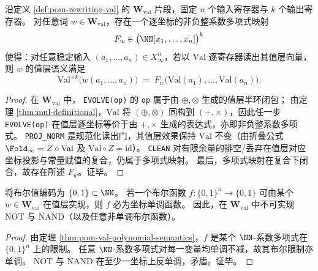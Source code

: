 \begin{theorem}[值层半环语义的多项式刻画]\label{thm:pom-val-polynomial-semantics}
沿定义 \ref{def:pom-rewriting-val} 的 \(\mathbf{W}_{\mathrm{val}}\) 片段，固定 \(n\) 个输入寄存器与 \(k\) 个输出寄存器。
对任意词 \(w\in\mathbf{W}_{\mathrm{val}}\)，存在一个逐坐标的非负整系数多项式映射
\[
F_w\in\bigl(\NN[x_1,\dots,x_n]\bigr)^k
\]
使得：对任意稳定输入 \((a_1,\dots,a_n)\in X_\infty^n\)，若以 \(\mathrm{Val}\) 逐寄存器读出其值层向量，则 \(w\) 的值层语义满足
\[
\mathrm{Val}^{\times k}\!\bigl(w(a_1,\dots,a_n)\bigr)
\;=\;
F_w\!\bigl(\mathrm{Val}(a_1),\dots,\mathrm{Val}(a_n)\bigr).
\]
\end{theorem}
\begin{proof}
在 \(\mathbf{W}_{\mathrm{val}}\) 中，
\texttt{EVOLVE(op)} 的 \texttt{op} 属于由 \(\oplus,\otimes\) 生成的值层半环闭包；
由定理 \ref{thm:mul-definitional}，\(\mathrm{Val}\) 将 \((\oplus,\otimes)\) 同构到 \((+,\times)\)，因此任一步 \texttt{EVOLVE(op)} 在值层逐坐标等价于由 \(+,\times\) 生成的表达式，亦即非负整系数多项式。
\texttt{PROJ\_NORM} 是规范化读出门，其值层效果保持 \(\mathrm{Val}\) 不变（由折叠公式 \(\Fold_\infty=Z\circ\mathrm{Val}\) 及 \(\mathrm{Val}\circ Z=\mathrm{id}\)）。
\texttt{CLEAN} 对有限余量的排空/丢弃在值层对应坐标投影与常量赋值的复合，仍属于多项式映射。
最后，多项式映射在复合下闭合，故存在所述 \(F_w\)。证毕。
\end{proof}

\begin{corollary}[值层布尔可表达性的单调性屏蔽]\label{cor:pom-val-monotone-boolean}
将布尔值编码为 \(\{0,1\}\subset\NN\)。
若一个布尔函数 \(f:\{0,1\}^n\to\{0,1\}\) 可由某个 \(w\in\mathbf{W}_{\mathrm{val}}\) 在值层实现，则 \(f\) 必为坐标单调函数。
因此，在 \(\mathbf{W}_{\mathrm{val}}\) 中不可实现 \(\mathrm{NOT}\) 与 \(\mathrm{NAND}\)（以及任意非单调布尔函数）。
\end{corollary}
\begin{proof}
由定理 \ref{thm:pom-val-polynomial-semantics}，\(f\) 是某个 \(\NN\)-系数多项式在 \(\{0,1\}^n\) 上的限制。
任意 \(\NN\)-系数多项式对每一变量均单调不减，故其布尔限制亦单调。
\(\mathrm{NOT}\) 与 \(\mathrm{NAND}\) 在至少一坐标上反单调，矛盾。证毕。
\end{proof}

